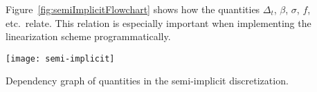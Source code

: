 Figure~\ref{fig:semiImplicitFlowchart} shows how the quantities $\Delta_t$,
$\beta$, $\sigma$, $f$, etc.~relate. This relation is especially important when
implementing the linearization scheme programmatically. 
\begin{sidewaystable}[hp]
  \centering
  \texttt{[image: semi-implicit]}
  \caption{Dependency graph of quantities in the semi-implicit discretization.}
  \label{fig:semiImplicitFlowchart}
\end{sidewaystable}

